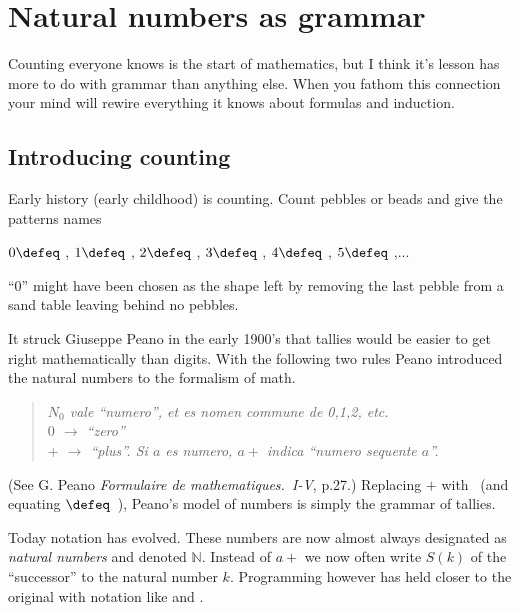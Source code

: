 \section{Natural numbers as grammar}
Counting everyone knows is the start of mathematics, but I think it's lesson 
has more to do with grammar than anything else.  When you fathom 
this connection your mind will rewire everything it knows about formulas 
and induction.  

\subsection{Introducing counting}
Early history (early childhood) is counting.  Count 
pebbles or beads and give the patterns names
\begin{center}
    $0\defeq$ \underline{\hspace{5mm}}, 
    $1\defeq$ \StrokeOne,
    $2\defeq$ \StrokeTwo,
    $3\defeq$ \StrokeThree,
    $4\defeq$ \StrokeFour,
    $5\defeq$ \StrokeFive,...
\end{center}
``0'' might have been chosen as the shape left by removing the last pebble from
a sand table leaving behind no pebbles.

It struck Giuseppe Peano in the early 1900's that tallies 
would be easier to get right mathematically than digits. With the following two rules
Peano introduced the natural numbers to the formalism of math.
\begin{quote}
    \textit{
    $N_0$ vale ``numero'', et es nomen commune de 0,1,2, etc.\\
    $0$ $\to$  ``zero''\\
    $+$ $\to$ ``plus''.  Si $a$ es numero, $a+$ indica ``numero sequente $a$''.
    }
\end{quote}
(See G. Peano \emph{Formulaire de mathematiques.~I-V}, p.27.)
Replacing $+$ with \StrokeOne ~(and equating \StrokeFive$\defeq$\StrokeFour~\StrokeOne),
Peano's model of numbers is simply the grammar of tallies.

Today notation has evolved.  These numbers are now almost always designated as
\emph{natural numbers} and denoted $\mathbb{N}$.  Instead of $a+$ we now 
often write $S(k)$ of the ``successor'' to the natural number $k$.  
Programming however has held closer to the original with notation like 
 and .

